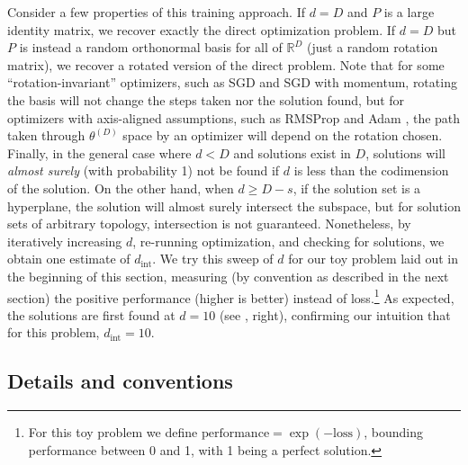 \documentclass{article} %
\newcommand{\thetaD}{\theta^{(D)}}
\newcommand{\dint}{d_{\mathrm{int}}}
\begin{document}
Consider a few properties of this training approach.
If $d=D$ and $P$ is a large identity matrix, we recover exactly the direct optimization problem. If $d=D$ but $P$ is instead a random orthonormal basis for all of $\mathbb{R}^D$ (just a random rotation matrix), we recover a rotated version of the direct problem.
Note that for some ``rotation-invariant'' optimizers, such as SGD and SGD with momentum, rotating the basis will not change the steps taken nor the solution found, but for optimizers with axis-aligned assumptions, such as RMSProp \citep{tieleman-2012-lecture-6.5-rmsprop:-divide} and Adam \citep{kingma-2014-arXiv-adam:-a-method-for-stochastic}, the path taken through $\thetaD$ space by an optimizer will depend on the rotation chosen.
Finally, in the general case where $d<D$ and solutions exist in $D$, solutions will \emph{almost surely} (with probability 1) not be found if $d$ is less than the codimension of the solution. 
On the other hand, when $d \geq D - s$,
if the solution set is a hyperplane, the solution will almost surely intersect the subspace, but for solution sets of arbitrary topology, intersection is not guaranteed.
Nonetheless, by iteratively increasing $d$, re-running optimization, and checking for solutions, we obtain one estimate of $\dint$. We try this sweep of $d$ for our toy problem laid out in the beginning of this section, measuring (by convention as described in the next section) the positive performance (higher is better) instead of loss.\footnote{For this toy problem we define $\mathrm{performance} = \exp({-\mathrm{loss}})$, bounding performance between 0 and 1, with 1 being a perfect solution.}
As expected, the solutions are first found at $d = 10$ (see , right), confirming our intuition that for this problem, $\dint = 10$.



\subsection{Details and conventions}



\end{document}
